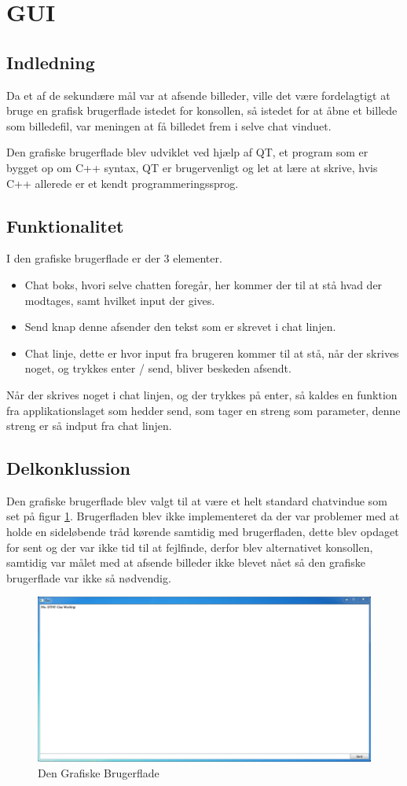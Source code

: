 \section{GUI}

\subsection{Indledning}
Da et af de sekundære mål var at afsende billeder, ville det være fordelagtigt at bruge en grafisk brugerflade istedet for konsollen, så istedet for at åbne et billede som billedefil, var meningen at få billedet frem i selve chat vinduet.

Den grafiske brugerflade blev udviklet ved hjælp af QT, et program som er bygget op om C++ syntax, QT er brugervenligt og let at lære at skrive, hvis C++ allerede er et kendt programmeringssprog.\\
\subsection{Funktionalitet}

I den grafiske brugerflade er der 3 elementer.
\begin{itemize}
	\item Chat boks, hvori selve chatten foregår, her kommer der til at stå hvad der modtages, samt hvilket input der gives.
	\item Send knap denne afsender den tekst som er skrevet i chat linjen.
	\item Chat linje, dette er hvor input fra brugeren kommer til at stå, når der skrives noget, og trykkes enter / send, bliver beskeden afsendt.
\end{itemize}

Når der skrives noget i chat linjen, og der trykkes på enter, så kaldes en funktion fra applikationslaget som hedder send, som tager en streng som parameter, denne streng er så indput fra chat linjen.

\subsection{Delkonklussion}
Den grafiske brugerflade blev valgt til at være et helt standard chatvindue som set på figur \ref{fig:GUI}.
Brugerfladen blev ikke implementeret da der var problemer med at holde en sideløbende tråd kørende samtidig med brugerfladen, dette blev opdaget for sent og der var ikke tid til at fejlfinde, derfor blev alternativet konsollen, samtidig var målet med at afsende billeder ikke blevet nået så den grafiske brugerflade var ikke så nødvendig.




\begin{figure}[h]
\centering
\includegraphics[scale=0.5]{Billeder/GUI.PNG}
\caption{Den Grafiske Brugerflade}
\label{fig:GUI}
\end{figure}